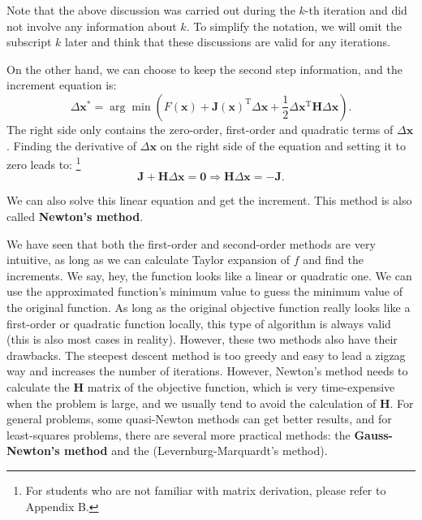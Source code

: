 Note that the above discussion was carried out during the $k$-th iteration and did not involve any information about $k$. To simplify the notation, we will omit the subscript $k$ later and think that these discussions are valid for any iterations.

On the other hand, we can choose to keep the second step information, and the increment equation is:
\begin{equation}
    \Delta \mathbf{x}^* = \arg \min \left(F\left( \mathbf{x} \right) + \mathbf{J} \left( \mathbf{x} \right)^\mathrm{ T} \Delta \mathbf{x} + \frac{1}{2}\Delta {\mathbf{x}^\mathrm{T}}\mathbf{H} \Delta \mathbf{x} \right).
\end{equation}
The right side only contains the zero-order, first-order and quadratic terms of $\Delta \mathbf{x}$. Finding the derivative of $\Delta \mathbf{x}$ on the right side of the equation and setting it to zero leads to: \footnote{For students who are not familiar with matrix derivation, please refer to Appendix B. }
\begin{equation}
    \label{eq:newton-method}
    \mathbf{J} + \mathbf{H} \Delta \mathbf{x} = \mathbf{0} \Rightarrow
    \mathbf{H} \Delta \mathbf{x} = -\mathbf{J}.
\end{equation}

We can also solve this linear equation and get the increment. This method is also called \textbf{Newton's method}.

We have seen that both the first-order and second-order methods are very intuitive, as long as we can calculate Taylor expansion of $f$ and find the increments. We say, hey, the function looks like a linear or quadratic one. We can use the approximated function's minimum value to guess the minimum value of the original function. As long as the original objective function really looks like a first-order or quadratic function locally, this type of algorithm is always valid (this is also most cases in reality). However, these two methods also have their drawbacks. The steepest descent method is too greedy and easy to lead a zigzag way and increases the number of iterations. However, Newton's method needs to calculate the $\mathbf{H}$ matrix of the objective function, which is very time-expensive when the problem is large, and we usually tend to avoid the calculation of $\mathbf{H}$. For general problems, some quasi-Newton methods can get better results, and for least-squares problems, there are several more practical methods: the \textbf{Gauss-Newton's method} and the (Levernburg-Marquardt's method).


